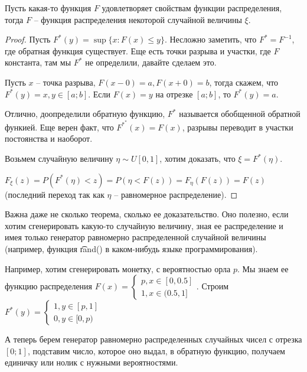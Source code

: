 \begin{theorem}

    Пусть какая-то функция $F$ удовлетворяет свойствам функции распределения, тогда $F$ -- функция распределения некоторой случайной величины $\xi$.
\end{theorem}
\begin{proof}
    Пусть $F^*(y) = \sup \{x\colon F(x) \leq y\}$.
    Несложно заметить, что $F^* = F^{-1}$, где обратная функция существует. 
    Еще есть точки разрыва и участки, где $F$ константа, там мы $F^*$ не определили, давайте сделаем это.

    Пусть $x$ -- точка разрыва, $F(x-0) = a, F(x+0) = b$, тогда скажем, что $F^*(y) = x, y \in [a; b]$.
    Если $F(x) = y$ на отрезке $[a; b]$, то $F^*(y) = a$.

    Отлично, доопределили обратную функцию, $F^*$ называется обобщенной обратной функией.
    Еще верен факт, что $F^{*^*}(x) = F(x)$, разрывы переводит в участки постоянства и наоборот.

    Возьмем  случайную величину $\eta \sim U[0, 1]$, хотим доказать, что $\xi = F^*(\eta)$.

    $F_{\xi}(z) = P(F^*(\eta) < z) = P(\eta < F(z)) = F_{\eta}(F(z)) = F(z)$ (последний переход так как $\eta$ -- равномерное распределение).
\end{proof}
\begin{Rem}
Важна даже не сколько теорема, сколько ее доказательство. Оно полезно, если хотим сгенерировать какую-то случайную величину, зная ее распределение и имея только
генератор равномерно распределенной случайной величины (например, функция \t{rand()} в каком-нибудь языке программирования).

Например, хотим сгенерировать монетку, с вероятностью орла $p$. Мы знаем ее функцию распределения $F(x) = \begin{cases}p, x \in [0, 0.5] \\ 1, x \in (0.5, 1]\end{cases}$.
Строим $F^*(y) = \begin{cases} 1, y \in [p, 1] \\ 0, y \in [0, p) \end{cases}$

А теперь берем генератор равномерно распределенных случайных чисел с отрезка $[0; 1]$, подставим число, которое оно выдал, в обратную функцию, получаем единичку или нолик с нужными вероятностями.
\end{Rem}


